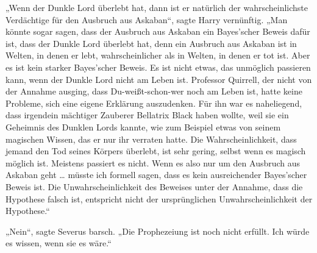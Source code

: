 „Wenn der Dunkle Lord überlebt hat, dann ist er natürlich der wahrscheinlichste Verdächtige für den Ausbruch aus Askaban“, sagte Harry vernünftig.
„Man könnte sogar sagen, dass der Ausbruch aus Askaban ein Bayes’scher Beweis dafür ist, dass der Dunkle Lord überlebt hat, denn ein Ausbruch aus Askaban ist in Welten, in denen er lebt, wahrscheinlicher als in Welten, in denen er tot ist. Aber es ist kein starker Bayes’scher Beweis. Es ist nicht etwas, das unmöglich passieren kann, wenn der Dunkle Lord nicht am Leben ist. Professor Quirrell, der nicht von der Annahme ausging, dass Du-weißt-schon-wer noch am Leben ist, hatte keine Probleme, sich eine eigene Erklärung auszudenken. Für ihn war es naheliegend, dass irgendein mächtiger Zauberer Bellatrix Black haben wollte, weil sie ein Geheimnis des Dunklen Lords kannte, wie zum Beispiel etwas von seinem magischen Wissen, das er nur ihr verraten hatte. Die Wahrscheinlichkeit, dass jemand den Tod seines Körpers überlebt, ist sehr gering, selbst wenn es magisch möglich ist. Meistens passiert es nicht. Wenn es also nur um den Ausbruch aus Askaban geht … müsste ich formell sagen, dass es kein ausreichender Bayes’scher Beweis ist. Die Unwahrscheinlichkeit des Beweises unter der Annahme, dass die Hypothese falsch ist, entspricht nicht der ursprünglichen Unwahrscheinlichkeit der Hypothese.“

„Nein“, sagte Severus barsch.
„Die Prophezeiung ist noch nicht erfüllt. Ich würde es wissen, wenn sie es wäre.“

